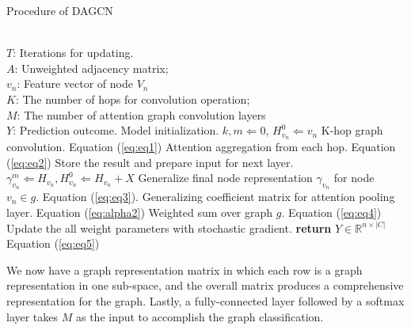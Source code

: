 \documentclass[conference]{IEEEtran}
\begin{document}
		\begin{algorithm}[!h]
            \caption{Procedure of DAGCN} 
            \label{alg1}
            \begin{algorithmic}[1]
                \REQUIRE ~~\\
                    $T$: Iterations for updating. \\
                    $A$: Unweighted adjacency matrix; \\
                    $v_n$: Feature vector of node $V_n$ \\
                    $K$: The number of hops for convolution operation; \\
                    $M$: The number of attention graph convolution layers 
                \ENSURE  ~~\\
                    $Y$: Prediction outcome. 
                \STATE Model initialization. $k, m \Leftarrow 0$,  $H_{v_n}^0 \Leftarrow v_n$
                            \STATE K-hop graph convolution. Equation (\ref{eq:eq1})
                        \ENDFOR
                        \STATE Attention aggregation from each hop. Equation (\ref{eq:eq2})
                        \STATE Store the result and prepare input for next layer. \\
                           $\gamma_{v_n}^m \Leftarrow H_{v_n}, H_{v_n}^0 \Leftarrow H_{v_n} + X$
                    \ENDFOR
                    \STATE Generalize final node representation $\gamma_{v_n}$ for node $v_n         \in g$. Equation (\ref{eq:eq3}). 
                    \STATE Generalizing coefficient matrix for attention pooling layer.  Equation (\ref{eq:alpha2})
                    \STATE Weighted sum over graph $g$. Equation (\ref{eq:eq4})
                    \STATE Update the all weight parameters with stochastic gradient.
                \ENDFOR
                \STATE \textbf{return} $Y \in \mathbb{R}^{n \times |C|}$  Equation (\ref{eq:eq5})
            \end{algorithmic}
        \end{algorithm}
		
		We now have a graph representation matrix in which each row is a graph representation in one sub-space, and the overall matrix produces a comprehensive representation for the graph. Lastly, a fully-connected layer followed by a softmax layer takes $M$ as the input to accomplish the graph classification. 
		
\end{document}
